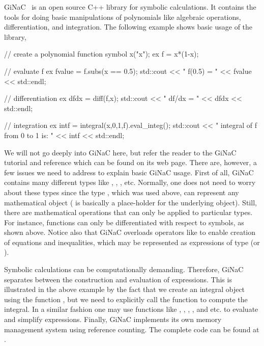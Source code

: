 GiNaC~\citep{BauerFrinkKreckel2000} is an open source C++ library
for symbolic calculations.  It contains the tools for doing basic
manipulations of polynomials like algebraic operations, differentiation,
and integration.  The following example shows basic usage of the library,
\begin{c++}
// create a polynomial function
symbol x("x");
ex f = x*(1-x);

// evaluate f
ex fvalue = f.subs(x == 0.5);
std::cout << " f(0.5) = " << fvalue << std::endl;

// differentiation
ex dfdx  = diff(f,x);
std::cout << " df/dx = " << dfdx << std::endl;

// integration
ex intf  = integral(x,0,1,f).eval_integ();
std::cout << " integral of f from 0 to 1 is: " << intf << std::endl;
\end{c++}
We will not go deeply into GiNaC here, but refer the reader to the
GiNaC tutorial and reference which can be found on its web page. There
are, however, a few issues we need to address to explain basic GiNaC
usage. First of all, GiNaC contains many different types like
, , , etc.  Normally, one does not
need to worry about these types since the type , which was
used above, can represent any mathematical object ( is
basically a place-holder for the underlying object). Still, there are
mathematical operations that can only be applied to particular
types. For instance, functions can only be differentiated with respect
to symbols, as shown above.  Notice also that GiNaC overloads
operators like \emp{==} to enable creation of equations and
inequalities, which may be represented as expressions of
type  (or ).

Symbolic calculations can be computationally demanding. Therefore, GiNaC
separates between the construction and evaluation of expressions. This is
illustrated in the above example by the fact that we create an integral
object using the function , but we need to explicitly call
the function  to compute the integral. In a similar
fashion one may use functions like , , ,
, and  etc. to evaluate
and simplify expressions.  Finally, GiNaC implements its own memory
management system using reference counting.  The complete code can be
found at .

